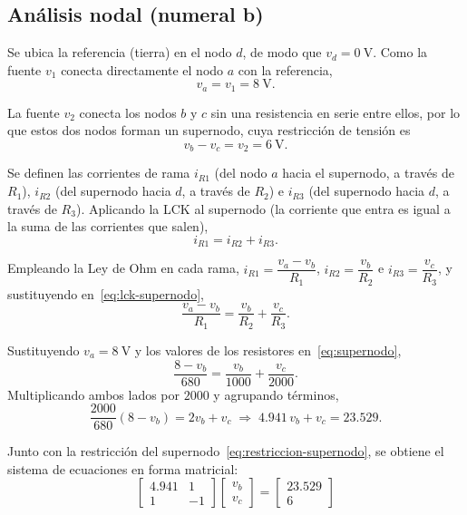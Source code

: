 \documentclass[conference,10pt]{IEEEtran}
\begin{document}
\subsection{Análisis nodal (numeral b)}
Se ubica la referencia (tierra) en el nodo $d$, de modo que $v_d=0~\mathrm{V}$. Como la fuente $v_1$ conecta directamente el nodo $a$ con la referencia,
\begin{equation}
  v_a = v_1 = 8~\mathrm{V}.
\end{equation}

La fuente $v_2$ conecta los nodos $b$ y $c$ sin una resistencia en serie entre ellos, por lo que estos dos nodos forman un supernodo, cuya restricción de tensión es
\begin{equation}
  v_b - v_c = v_2 = 6~\mathrm{V}. \label{eq:restriccion-supernodo}
\end{equation}

Se definen las corrientes de rama $i_{R1}$ (del nodo $a$ hacia el supernodo, a través de $R_1$), $i_{R2}$ (del supernodo hacia $d$, a través de $R_2$) e $i_{R3}$ (del supernodo hacia $d$, a través de $R_3$). Aplicando la LCK al supernodo (la corriente que entra es igual a la suma de las corrientes que salen),
\begin{equation}
  i_{R1} = i_{R2} + i_{R3}. \label{eq:lck-supernodo}
\end{equation}

Empleando la Ley de Ohm en cada rama, $i_{R1}=\dfrac{v_a-v_b}{R_1}$, $i_{R2}=\dfrac{v_b}{R_2}$ e $i_{R3}=\dfrac{v_c}{R_3}$, y sustituyendo en~\eqref{eq:lck-supernodo},
\begin{equation}
  \frac{v_a-v_b}{R_1} = \frac{v_b}{R_2} + \frac{v_c}{R_3}. \label{eq:supernodo}
\end{equation}

Sustituyendo $v_a=8~\mathrm{V}$ y los valores de los resistores en~\eqref{eq:supernodo},
\begin{equation}
  \frac{8-v_b}{680} = \frac{v_b}{1000} + \frac{v_c}{2000}.
\end{equation}
Multiplicando ambos lados por $2000$ y agrupando términos,
\begin{equation}
  \frac{2000}{680}(8-v_b) = 2v_b + v_c \;\Rightarrow\; 4.941\,v_b + v_c = 23.529.
\end{equation}

Junto con la restricción del supernodo~\eqref{eq:restriccion-supernodo}, se obtiene el sistema de ecuaciones en forma matricial:
\begin{equation*}
  \begin{bmatrix}
    4.941 & 1 \\
    1 & -1
  \end{bmatrix}
  \begin{bmatrix}
    v_b \\
    v_c
  \end{bmatrix}
  =
  \begin{bmatrix}
    23.529 \\
    6
  \end{bmatrix}
\end{equation*}
\end{document}
